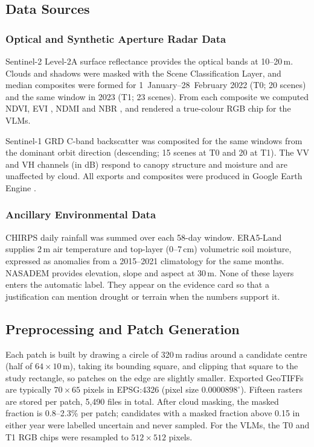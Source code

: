 \documentclass[11pt]{article}
\begin{document}
\subsection{Data Sources}

\subsubsection{Optical and Synthetic Aperture Radar Data}

Sentinel-2 Level-2A surface reflectance \citep{drusch2012} provides the
optical bands at 10--20\,m. Clouds and shadows were masked with the
Scene Classification Layer, and median composites were formed for
1~January--28~February 2022 (T0; 20 scenes) and the same window in 2023
(T1; 23 scenes). From each composite we computed NDVI, EVI
\citep{huete2002}, NDMI \citep{gao1996} and NBR \citep{keybenson2006},
and rendered a true-colour RGB chip for the VLMs.

Sentinel-1 GRD C-band backscatter \citep{torres2012} was composited for
the same windows from the dominant orbit direction (descending; 15
scenes at T0 and 20 at T1). The VV and VH channels (in dB) respond to
canopy structure and moisture and are unaffected by cloud. All exports
and composites were produced in Google Earth Engine \citep{gorelick2017}.

\subsubsection{Ancillary Environmental Data}

CHIRPS daily rainfall \citep{funk2015} was summed over each 58-day
window. ERA5-Land \citep{munozsabater2021} supplies 2\,m air temperature
and top-layer (0--7\,cm) volumetric soil moisture, expressed as
anomalies from a 2015--2021 climatology for the same months. NASADEM
\citep{nasadem2020} provides elevation, slope and aspect at 30\,m. None
of these layers enters the automatic label. They appear on the evidence
card so that a justification can mention drought or terrain when the
numbers support it.

\subsection{Preprocessing and Patch Generation}

Each patch is built by drawing a circle of 320\,m radius around a
candidate centre (half of $64 \times 10$\,m), taking its bounding
square, and clipping that square to the study rectangle, so patches on
the edge are slightly smaller. Exported GeoTIFFs are typically
$70 \times 65$ pixels in EPSG:4326 (pixel size $0.0000898^\circ$). Fifteen
rasters are stored per patch, 5,490 files in total. After cloud masking,
the masked fraction is 0.8--2.3\% per patch; candidates with a masked
fraction above 0.15 in either year were labelled uncertain and never
sampled. For the VLMs, the T0 and T1 RGB chips were resampled to
$512 \times 512$ pixels.
\end{document}
